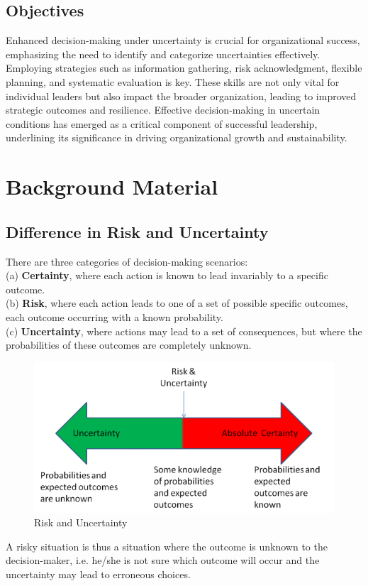 \documentclass{article}
\begin{document}
\subsection{Objectives}
Enhanced decision-making under uncertainty is crucial for organizational success, emphasizing the need to identify and categorize uncertainties effectively. Employing strategies such as information gathering, risk acknowledgment, flexible planning, and systematic evaluation is key.\cite{forman2001decision} These skills are not only vital for individual leaders but also impact the broader organization, leading to improved strategic outcomes and resilience. Effective decision-making in uncertain conditions has emerged as a critical component of successful leadership, underlining its significance in driving organizational growth and sustainability.

\section{Background Material}
\subsection{Difference in Risk and Uncertainty}
 There are three categories of decision-making scenarios:\\
 (a) \textbf{Certainty}, where each action is known to lead invariably to a specific outcome.\\
 (b) \textbf{Risk}, where each action leads to one of a set of possible specific outcomes, each outcome occurring with a known probability. \\
 (c) \textbf{Uncertainty}, where actions may lead to a set of consequences, but where the probabilities of these outcomes are completely unknown.
 \\
 \begin{figure}[h!]
\centering
  \includegraphics[scale=0.5]{barometer-of-certainty-and-uncertainty-600x300.png}
  \caption{Risk and Uncertainty \cite{Itsomerz2014}}
\end{figure}
 A risky situation is thus a situation where the outcome is unknown to the decision-maker, i.e. he/she is not sure which outcome will occur and the uncertainty may lead to erroneous choices. 
\end{document}
